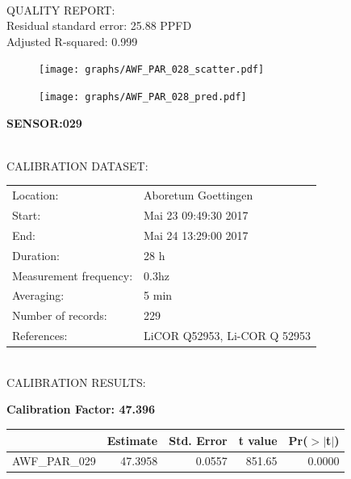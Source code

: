 \documentclass[oneside]{report}
\begin{document}
\hrulefill\\
QUALITY REPORT:\\
Residual standard error: 25.88 PPFD\\
Adjusted R-squared: 0.999



\begin{figure}[H]
  \centering
  \texttt{[image: graphs/AWF\_PAR\_028\_scatter.pdf]}
\end{figure}




\begin{figure}[H]
  \centering
  \texttt{[image: graphs/AWF\_PAR\_028\_pred.pdf]}
\end{figure}

\pagebreak


\begin{center}
\large{\textbf{SENSOR:029}}\\
\end{center}

\hrulefill\\
CALIBRATION DATASET:\\
\begin{table}[h!]
  \centering
  \label{tab:table1}
  \begin{tabular}{ll}
    Location: & Aboretum Goettingen\\ 
    
    
    Start:  & Mai 23 09:49:30 2017 \\
    End:   & Mai 24 13:29:00 2017\\ 
    Duration: & 28 h\\
    Measurement frequency: & 0.3hz\\
    Averaging:  &5 min\\
    Number of records: & 229 \\
    References: & LiCOR Q52953, Li-COR Q 52953 \\
  \end{tabular}
\end{table}

\hrulefill\\
CALIBRATION RESULTS:\\


\begin{center}
\textbf{\large{Calibration Factor: 47.396}}\\
\end{center}
\begin{table}[ht]
\centering
\begin{tabular}{rrrrr}
  \hline
 & Estimate & Std. Error & t value & Pr($>$$|$t$|$) \\ 
  \hline
AWF\_PAR\_029 & 47.3958 & 0.0557 & 851.65 & 0.0000 \\ 
   \hline
\end{tabular}
\end{table}
\end{document}
